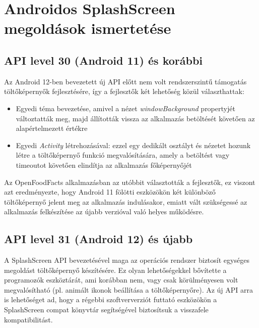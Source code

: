 \chapter{Androidos SplashScreen megoldások ismertetése}
\section{API level 30 (Android 11) és korábbi}
Az Android 12-ben bevezetett új API előtt nem volt rendszerszintű támogatás töltőképernyők
fejlesztésére, így a fejlesztők két lehetőség közül választhattak: %
\begin{itemize}
 \item Egyedi téma bevezetése, amivel a nézet \textit{windowBackground} propertyjét változtatták meg,
 majd állították vissza az alkalmazás betöltését követően az alapértelmezett értékre
 \item Egyedi \textit{Activity} létrehozásával: ezzel egy dedikált osztályt és nézetet hozunk létre
 a töltőképernyő funkció megvalósítására, amely a betöltést vagy timeoutot követően elindítja
 az alkalmazás főképernyőjét %
\end{itemize}


Az OpenFoodFacts alkalmazásban az utóbbit választották a fejlesztők, ez viszont azt eredményezte,
hogy Android 11 fölötti eszközökön két különböző töltőképernyő jelent meg az alkalmazás indulásakor,
emiatt vált szükségessé az alkalmazás felkészítése az újabb verzióval való helyes működésre.

\section{API level 31 (Android 12) és újabb}
A SplashScreen API bevezetésével maga az operációs rendszer biztosít egységes megoldást
töltőképernyő készítésére. Ez olyan lehetőségekkel bővítette a programozók eszköztárát, ami korábban
nem, vagy csak körülményesen volt megvalósítható (pl. animált ikonok beállítása
a töltőképernyőre).
Az új API arra is lehetőséget ad, hogy a régebbi szoftververziót futtató eszközökön a SplashScreen
compat könyvtár %
segítségével biztosítsuk a visszafele kompatibilitást.
